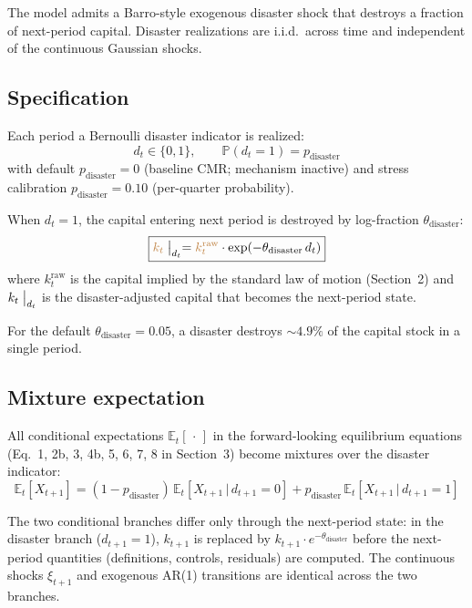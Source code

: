 \documentclass[11pt]{article}
\begin{document}
The model admits a Barro-style exogenous disaster shock that destroys a
fraction of next-period capital. Disaster realizations are i.i.d.\ across
time and independent of the continuous Gaussian shocks.

\subsection{Specification}

Each period a Bernoulli disaster indicator is realized:
\begin{equation*}
  d_t \in \{0, 1\}, \qquad
  \mathbb{P}(d_t = 1) = p_{\text{disaster}}
\end{equation*}
with default $p_{\text{disaster}} = 0$ (baseline CMR; mechanism
inactive) and stress calibration $p_{\text{disaster}} = 0.10$
(per-quarter probability).

When $d_t = 1$, the capital entering next period is destroyed by
log-fraction $\theta_{\text{disaster}}$:
\begin{equation*}
  \boxed{\textcolor{brown}{k_t}\bigm|_{d_t}
    = \textcolor{brown}{k_t^{\text{raw}}}
      \cdot \exp(-\theta_{\text{disaster}}\, d_t)}
\end{equation*}
where $k_t^{\text{raw}}$ is the capital implied by the standard law of
motion (Section~2) and $k_t\bigm|_{d_t}$ is the disaster-adjusted
capital that becomes the next-period state.

For the default $\theta_{\text{disaster}} = 0.05$, a disaster destroys
${\sim}4.9\%$ of the capital stock in a single period.

\subsection{Mixture expectation}

All conditional expectations $\mathbb{E}_t[\,\cdot\,]$ in the
forward-looking equilibrium equations (Eq.~1, 2b, 3, 4b, 5, 6, 7, 8 in
Section~3) become mixtures over the disaster indicator:
\begin{equation*}
  \boxed{\mathbb{E}_t[X_{t+1}]
    = (1 - p_{\text{disaster}})\,
      \mathbb{E}_t\!\left[X_{t+1} \,\big|\, d_{t+1} = 0\right]
    + p_{\text{disaster}}\,
      \mathbb{E}_t\!\left[X_{t+1} \,\big|\, d_{t+1} = 1\right]}
\end{equation*}

The two conditional branches differ only through the next-period
state: in the disaster branch ($d_{t+1} = 1$), $k_{t+1}$ is replaced by
$k_{t+1} \cdot e^{-\theta_{\text{disaster}}}$ before the next-period
quantities (definitions, controls, residuals) are computed. The
continuous shocks $\xi_{t+1}$ and exogenous AR(1) transitions are
identical across the two branches.
\end{document}
